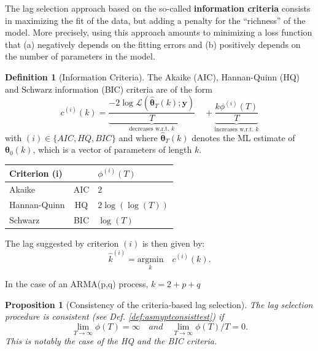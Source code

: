 \documentclass[
  12pt,
]{book}
\newtheorem{proposition}{Proposition}[chapter]
\theoremstyle{definition}
\newtheorem{definition}{Definition}[chapter]
\theoremstyle{definition}
\theoremstyle{definition}
\theoremstyle{definition}
\theoremstyle{remark}
\begin{document}
The lag selection approach based on the so-called \textbf{information criteria} consists in maximizing the fit of the data, but adding a penalty for the ``richness'' of the model. More precisely, using this approach amounts to minimizing a loss function that (a) negatively depends on the fitting errors and (b) positively depends on the number of parameters in the model.

\begin{definition}[Information Criteria]
\protect\hypertarget{def:infocriteria}{}\label{def:infocriteria}The Akaike (AIC), Hannan-Quinn (HQ) and Schwarz information (BIC) criteria are of the form
\[
c^{(i)}(k) = \underbrace{\frac{- 2 \log \mathcal{L}(\hat{\boldsymbol\theta}_T(k);\mathbf{y})}{T}}_{\mbox{decreases w.r.t. $k$}} \quad +
\underbrace{
\frac{k\phi^{(i)}(T)}{T}}_{\mbox{increases w.r.t. $k$}}
\]
with \((i) \in\{AIC,HQ,BIC\}\) and where \(\hat{\boldsymbol\theta}_T(k)\) denotes the ML estimate of \(\boldsymbol\theta_0(k)\), which is a vector of parameters of length \(k\).

\begin{center}
\begin{tabular}{lcl}
\hline
Criterion (i) && $\phi^{(i)}(T)$\\
\hline
Akaike &AIC & $2$ \\
Hannan-Quinn & HQ & $2\log(\log(T))$ \\
Schwarz &BIC & $\log(T)$ \\
\hline
\end{tabular}
\end{center}

The lag suggested by criterion \((i)\) is then given by:
\[
\boxed{\hat{k}^{(i)} = \underset{k}{\mbox{argmin}} \quad c^{(i)}(k).}
\]
\end{definition}

In the case of an ARMA(p,q) process, \(k=2+p+q\)

\begin{proposition}[Consistency of the criteria-based lag selection]
\protect\hypertarget{prp:infocriteria}{}\label{prp:infocriteria}The lag selection procedure is consistent (see Def. \ref{def:asmyptconsisttest}) if
\[
\lim_{T \rightarrow \infty} \phi(T) = \infty \quad and \quad \lim_{T \rightarrow \infty} \phi(T)/T = 0.
\]
This is notably the case of the HQ and the BIC criteria.
\end{proposition}
\end{document}
